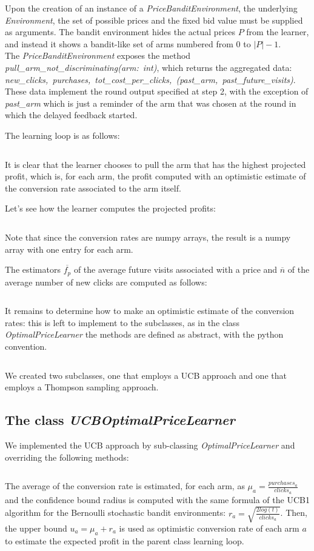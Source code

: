 \documentclass[11pt]{article} %
\begin{document}
Upon the creation of an instance of a \textit{PriceBanditEnvironment}, the underlying\\ \textit{Environment}, the set of possible prices and the fixed bid value must be supplied as arguments. The bandit environment hides the actual prices $P$ from the learner, and instead it shows a bandit-like set of arms numbered from $0$ to $|P|-1$.\\

The \textit{PriceBanditEnvironment} exposes the method \mbox{\textit{pull\_arm\_not\_discriminating(arm: int)}}, which returns the aggregated data:\\
\mbox{\textit{new\_clicks, purchases, tot\_cost\_per\_clicks, (past\_arm, past\_future\_visits)}}.\\

These data implement the round output specified at step 2, with the exception of \textit{past\_arm} which is just a reminder of the arm that was chosen at the round in which the delayed feedback started. 

The learning loop is as follows:
\inputminted{python}{code/step3_learning_loop.py}
It is clear that the learner chooses to pull the arm that has the highest projected profit, which is, for each arm, the profit computed with an optimistic estimate of the conversion rate associated to the arm itself.

Let's see how the learner computes the projected profits:
\inputminted{python}{code/step3_projected_profits.py}
Note that since the conversion rates are numpy arrays, the result is a numpy array with one entry for each arm.

The estimators $\overline{f_p}$ of the average future visits associated with a price and $\overline{n}$ of the average number of new clicks are computed as follows:
\inputminted{python}{code/step3_estimates.py}
It remains to determine how to make an optimistic estimate of the conversion rates: this is left to implement to the subclasses, as in the class \textit{OptimalPriceLearner} the methods are defined as abstract, with the python convention.
\inputminted{python}{code/step3_conversion_rates.py}
We created two subclasses, one that employs a UCB approach and one that employs a Thompson sampling approach.\\

\begin{samepage}
\subsection{The class \textit{UCBOptimalPriceLearner}}
We implemented the UCB approach by sub-classing  \textit{OptimalPriceLearner} and overriding the following methods:
\inputminted{python}{code/step3_ucb.py}
\end{samepage}
The average of the conversion rate is estimated, for each arm, as $\mu_a=\frac{purchases_a}{clicks_a}$ and the confidence bound radius is computed with the same formula of the UCB1 algorithm for the Bernoulli stochastic bandit environments: $r_a=\sqrt{\frac{2log(t)}{clicks_a}}$.
Then, the upper bound $u_a = \mu_a+r_a$ is used as optimistic conversion rate of each arm $a$ to estimate the expected profit in the parent class learning loop.\\
\end{document}
